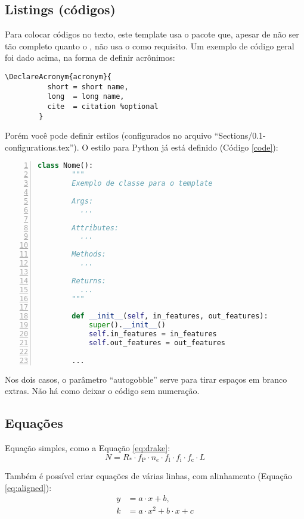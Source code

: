     \subsection{Listings (códigos)}
      Para colocar códigos no texto, este template usa o pacote  que, apesar de não ser tão completo quanto o , não usa o  como requisito. Um exemplo de código geral foi dado acima, na forma de definir acrônimos:
      \begin{lstlisting}[autogobble]
        \DeclareAcronym{acronym}{
          short = short name,
          long  = long name,
          cite  = citation %optional
        }
      \end{lstlisting}

      Porém você pode definir estilos (configurados no arquivo ``Sections/0.1-configurations.tex''). O estilo para Python já está definido (Código \ref{code}):
      \begin{lstlisting}[label=code, language=Python, numbers=left, autogobble]
        class Nome():
        """
        Exemplo de classe para o template
    
        Args:
          ...
    
        Attributes:
          ...
    
        Methods:
          ...
    
        Returns:
          ...
        """
    
        def __init__(self, in_features, out_features):
            super().__init__()
            self.in_features = in_features
            self.out_features = out_features

        ...
      \end{lstlisting}

      Nos dois casos, o parâmetro ``autogobble'' serve para tirar espaços em branco extras. Não há como deixar o código sem numeração.

    \subsection{Equações}
      Equação simples, como a Equação \eqref{eq:drake}:
      \begin{equation}
        N = R_* \cdot f_\text{P} \cdot n_e \cdot f_\text{l} \cdot f_\text{i} \cdot f_\text{c} \cdot L
        \label{eq:drake}
      \end{equation}

      Também é possível criar equações de várias linhas, com alinhamento (Equação \eqref{eq:aligned}):
      \begin{align}
        y &= a \cdot x + b, \\
        k &= a \cdot x^2 + b \cdot x + c
        \label{eq:aligned}
      \end{align}

